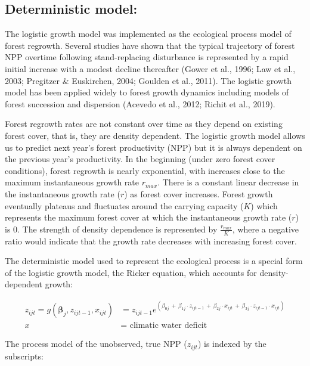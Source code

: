 \documentclass[
]{article}
\begin{document}
\hypertarget{deterministic-model}{%
\subsection{Deterministic model:}\label{deterministic-model}}

The logistic growth model was implemented as the ecological process
model of forest regrowth. Several studies have shown that the typical
trajectory of forest NPP overtime following stand-replacing disturbance
is represented by a rapid initial increase with a modest decline
thereafter (Gower et al., 1996; Law et al., 2003; Pregitzer \&
Euskirchen, 2004; Goulden et al., 2011). The logistic growth model has
been applied widely to forest growth dynamics including models of forest
succession and dispersion (Acevedo et al., 2012; Richit et al., 2019).

Forest regrowth rates are not constant over time as they depend on
existing forest cover, that is, they are density dependent. The logistic
growth model allows us to predict next year's forest productivity (NPP)
but it is always dependent on the previous year's productivity. In the
beginning (under zero forest cover conditions), forest regrowth is
nearly exponential, with increases close to the maximum instantaneous
growth rate \(r_{max}\). There is a constant linear decrease in the
instantaneous growth rate (\(r\)) as forest cover increases. Forest
growth eventually plateaus and fluctuates around the carrying capacity
(\(K\)) which represents the maximum forest cover at which the
instantaneous growth rate (\(r\)) is 0. The strength of density
dependence is represented by \(\frac{r_{max}}{K}\), where a negative
ratio would indicate that the growth rate decreases with increasing
forest cover.

The deterministic model used to represent the ecological process is a
special form of the logistic growth model, the Ricker equation, which
accounts for density-dependent growth:

\begin{align*}
z_{ijt} = g(\boldsymbol{\beta}_j, z_{ijt-1}, x_{ijt}) &= z_{ijt-1}e^{(\beta_{0j} \,+\, \beta_{1j} \cdot z_{ijt-1} \,+\, \beta_{2j}  \cdot x_{ijt} \,+\, \beta_{3j}  \cdot z_{ijt-1}  \cdot x_{ijt})}  \\
x &= \textrm{ climatic water deficit}
\end{align*}

The process model of the unobserved, true NPP (\(z_{ijt}\)) is indexed
by the subscripts:
\end{document}
